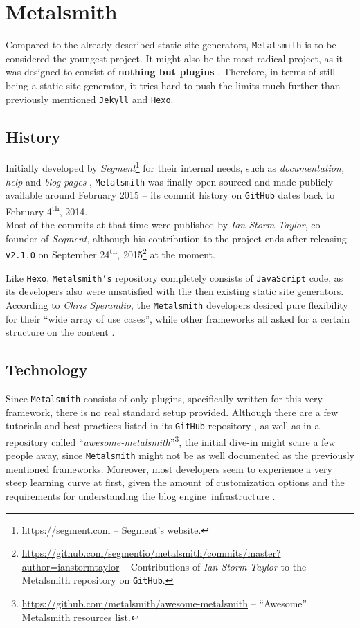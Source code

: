 \section{Metalsmith}
\label{sec:metalsmith}

Compared to the already described static site generators, \texttt{Metalsmith} is to be considered the youngest project.
It might also be the most radical project, as it was designed to consist of \textbf{nothing but plugins} \cite[31]{dhillon2016}. Therefore, in terms of still being a static site generator, it tries hard to push the limits much further than previously mentioned \texttt{Jekyll} and \texttt{Hexo}.

\subsection{History}
\label{sec:metalsmith-history}
Initially developed by \emph{Segment}\footnote{\url{https://segment.com} -- Segment's website.} for their internal needs, such as \emph{documentation, help} and \emph{blog pages} \cite{Metalsmith2015buildingblocks}, \texttt{Metalsmith} was finally open-sourced and made publicly available around February 2015 -- its commit history on \texttt{GitHub} dates back to February 4\textsuperscript{th}, 2014.\\
Most of the commits at that time were published by \emph{Ian Storm Taylor}, co-founder of \emph{Segment}, although his contribution to the project ends after releasing \texttt{v2.1.0} on September 24\textsuperscript{th}, 2015\footnote{\url{https://github.com/segmentio/metalsmith/commits/master?author=ianstormtaylor} -- Contributions of \emph{Ian Storm Taylor} to the Metalsmith repository on \texttt{GitHub}.} at the moment.

Like \texttt{Hexo}, \texttt{Metalsmith's} repository completely consists of \texttt{JavaScript} code, as its developers also were unsatisfied with the then existing static site generators. According to \emph{Chris Sperandio}, the \texttt{Metalsmith} developers desired pure flexibility for their ``wide array of use cases'', while other frameworks all asked for a certain structure on the content \cite{Metalsmith2015buildingblocks}.

\subsection{Technology}
\label{sec:metalsmith-technology}
Since \texttt{Metalsmith} consists of only plugins, specifically written for this very framework, there is no real standard setup provided. Although there are a few tutorials and best practices listed in its \texttt{GitHub} repository \cite{MetalsmithRepository}, as well as in a repository called ``\emph{awesome-metalsmith}''\footnote{\url{https://github.com/metalsmith/awesome-metalsmith} -- ``Awesome'' Metalsmith resources list.}, the initial dive-in might scare a few people away, since \texttt{Metalsmith} might not be as well documented as the previously mentioned frameworks. Moreover, most developers seem to experience a very steep learning curve at first, given the amount of customization options and the requirements for understanding the blog engine~infrastructure \cite[31]{dhillon2016}.

